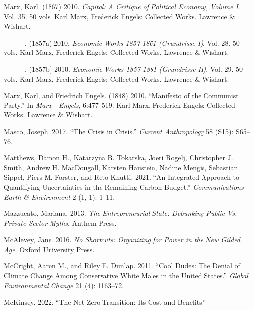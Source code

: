 \documentclass[a4paper, nobind]{templates/ociamthesis}
\newlength{\cslhangindent}
\newenvironment{CSLReferences}[2] %
 {%
  \setlength{\parindent}{0pt}
  \ifodd #1
  \let\oldpar\par
  \def\par{\hangindent=\cslhangindent\oldpar}
  \fi
  \setlength{\parskip}{1mm}
  \setlength{\baselineskip}{6mm}
 }%
 {}
\begin{document}
\begin{CSLReferences}{1}{0}
\leavevmode{}%
Marx, Karl. (1867) 2010. \emph{Capital: {A Critique} of {Political Economy}, {Volume I}}. Vol. 35. 50 vols. Karl {Marx}, {Frederick Engels}: {Collected Works}. {Lawrence \& Wishart}.

\leavevmode{}%
---------. (1857a) 2010. \emph{Economic {Works} 1857-1861 ({Grundrisse I})}. Vol. 28. 50 vols. Karl {Marx}, {Frederick Engels}: {Collected Works}. {Lawrence \& Wishart}.

\leavevmode{}%
---------. (1857b) 2010. \emph{Economic {Works} 1857-1861 ({Grundrisse II})}. Vol. 29. 50 vols. Karl {Marx}, {Frederick Engels}: {Collected Works}. {Lawrence \& Wishart}.

\leavevmode{}%
Marx, Karl, and Friedrich Engels. (1848) 2010. {``Manifesto of the {Communist Party}.''} In \emph{Marx - {Engels}}, 6:477--519. Karl {Marx}, {Frederick Engels}: {Collected Works}. {Lawrence \& Wishart}.

\leavevmode{}%
Masco, Joseph. 2017. {``The Crisis in Crisis.''} \emph{Current Anthropology} 58 (S15): S65--76.

\leavevmode{}%
Matthews, Damon H., Katarzyna B. Tokarska, Joeri Rogelj, Christopher J. Smith, Andrew H. MacDougall, Karsten Haustein, Nadine Mengis, Sebastian Sippel, Piers M. Forster, and Reto Knutti. 2021. {``An Integrated Approach to Quantifying Uncertainties in the Remaining Carbon Budget.''} \emph{Communications Earth \& Environment} 2 (1, 1): 1--11.

\leavevmode{}%
Mazzucato, Mariana. 2013. \emph{The {Entrepreneurial State}: {Debunking Public Vs}. {Private Sector Myths}}. {Anthem Press}.

\leavevmode{}%
McAlevey, Jane. 2016. \emph{No {Shortcuts}: {Organizing} for {Power} in the {New Gilded Age}}. {Oxford University Press}.

\leavevmode{}%
McCright, Aaron M., and Riley E. Dunlap. 2011. {``Cool Dudes: {The} Denial of Climate Change Among Conservative White Males in the {United States}.''} \emph{Global Environmental Change} 21 (4): 1163--72.

\leavevmode{}%
McKinsey. 2022. {``The Net-Zero Transition: {Its} Cost and Benefits.''}


\end{CSLReferences}
\end{document}
